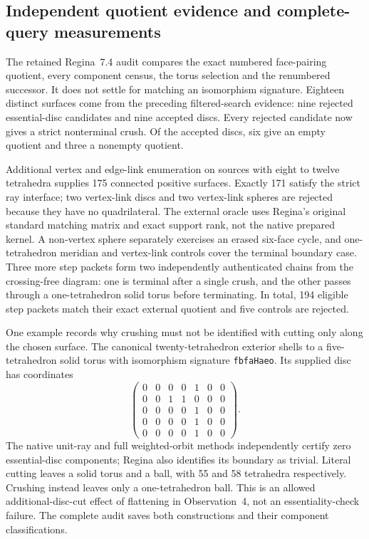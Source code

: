 \subsection{Independent quotient evidence and complete-query measurements}

The retained Regina~7.4 audit compares the exact numbered face-pairing
quotient, every component census, the torus selection and the renumbered
successor.  It does not settle for matching an isomorphism signature.
Eighteen distinct surfaces come from the preceding filtered-search evidence:
nine rejected essential-disc candidates and nine accepted discs.  Every
rejected candidate now gives a strict nonterminal crush.  Of the accepted
discs, six give an empty quotient and three a nonempty quotient.

Additional vertex and edge-link enumeration on sources with eight to twelve
tetrahedra supplies 175 connected positive surfaces.  Exactly 171 satisfy
the strict ray interface; two vertex-link discs and two vertex-link spheres
are rejected because they have no quadrilateral.  The external oracle uses
Regina's original standard matching matrix and exact support rank, not the
native prepared kernel.  A non-vertex sphere separately exercises an erased
six-face cycle, and one-tetrahedron meridian and vertex-link controls cover
the terminal boundary case.  Three more step packets form two independently
authenticated chains from the crossing-free diagram: one is terminal after
a single crush, and the other passes through a one-tetrahedron solid torus
before terminating.  In total, 194 eligible step packets match their exact
external quotient and five controls are rejected.

One example records why crushing must not be identified with cutting only
along the chosen surface.  The canonical twenty-tetrahedron exterior shells
to a five-tetrahedron solid torus with isomorphism signature
\texttt{fbfaHaeo}.  Its supplied disc has coordinates
\[
\begin{pmatrix}
0&0&0&0&1&0&0\\
0&0&1&1&0&0&0\\
0&0&0&0&1&0&0\\
0&0&0&0&1&0&0\\
0&0&0&0&1&0&0
\end{pmatrix}.
\]
The native unit-ray and full weighted-orbit methods independently certify
zero essential-disc components; Regina also identifies its boundary as
trivial.  Literal cutting leaves a solid torus and a ball, with 55 and 58
tetrahedra respectively.  Crushing instead leaves only a one-tetrahedron
ball.  This is an allowed additional-disc-cut effect of flattening in
Observation~4, not an essentiality-check failure.  The complete audit saves
both constructions and their component classifications.

